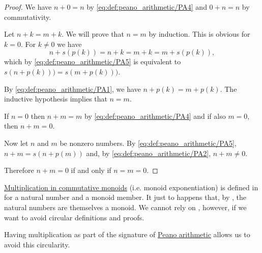 \begin{proof}
   We have \( n + 0 = n \) by \eqref{eq:def:peano_arithmetic/PA4} and \( 0 + n = n \) by commutativity.

   Let \( n + k = m + k \). We will prove that \( n = m \) by induction. This is obvious for \( k = 0 \). For \( k \neq 0 \) we have
  \begin{equation*}
    n + s(p(k))
    =
    n + k
    =
    m + k
    =
    m + s(p(k)),
  \end{equation*}
  which by \eqref{eq:def:peano_arithmetic/PA5} is equivalent to \( s(n + p(k))) = s(m + p(k))) \).

  By \eqref{eq:def:peano_arithmetic/PA1}, we have \( n + p(k) = m + p(k) \). The inductive hypothesis implies that \( n = m \).

   If \( n = 0 \) then \( n + m = m \) by \eqref{eq:def:peano_arithmetic/PA4} and if also \( m = 0 \), then \( n + m = 0 \).

  Now let \( n \) and \( m \) be nonzero numbers. By \eqref{eq:def:peano_arithmetic/PA5}, \( n + m = s(n + p(m)) \) and, by \eqref{eq:def:peano_arithmetic/PA2}, \( n + m \neq 0 \).

  Therefore \( n + m = 0 \) if and only if \( n = m = 0 \).
\end{proof}

\begin{remark}\label{rem:natural_number_multiplication}
  \hyperref[rem:additive_magma/multiplication]{Multiplication in commutative monoids} (i.e. monoid exponentiation) is defined in  for a natural number and a monoid member. It just to happens that, by , the natural numbers are themselves a monoid. We cannot rely on , however, if we want to avoid circular definitions and proofs.

  Having multiplication as part of the signature of \hyperref[def:peano_arithmetic]{Peano arithmetic} allows us to avoid this circularity.
\end{remark}

